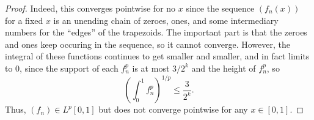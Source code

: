 \documentclass[12pt]{article}
\theoremstyle{definition}
\begin{document}
\begin{proof}
  Indeed, this converges pointwise for no $x$ since the sequence $(f_n(x))$ for a fixed $x$ is an unending chain of zeroes, ones, and some intermediary numbers for the ``edges'' of the trapezoids.
  The important part is that the zeroes and ones keep occuring in the sequence, so it cannot converge.
  However, the integral of these functions continues to get smaller and smaller, and in fact limits to 0, since the support of each $f_n^p$ is at most $3/2^k$ and the height of $f_n^p$, so \begin{equation*}
    \left( \int_0^1 f_n^p \right)^{1/p} \leq \frac{3}{2^k}.
  \end{equation*}
  Thus, $(f_n) \in L^p[0,1]$ but does not converge pointwise for any $x \in [0, 1]$.
\end{proof}
\end{document}
